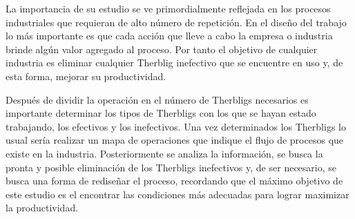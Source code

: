 \documentclass[letterpaper,12pt,openright,oneside]{article}
\theoremstyle{plain}
\begin{document}
La importancia de su estudio se ve primordialmente reflejada en los procesos industriales que requieran de alto número de repetición. En el diseño del trabajo lo más importante es que cada acción que lleve a cabo la empresa o industria brinde algún valor agregado al proceso. Por tanto el objetivo de cualquier industria es eliminar cualquier Therblig inefectivo que se encuentre en uso y, de esta forma, mejorar su productividad.

Después de dividir la operación en el número de Therbligs necesarios es importante determinar los tipos de Therbligs con los que se hayan estado trabajando, los efectivos y los inefectivos. Una vez determinados los Therbligs lo usual sería realizar un mapa de operaciones que indique el flujo de procesos que existe en la industria. Posteriormente se analiza la información, se busca la pronta y posible eliminación de los Therbligs inefectivos y, de ser necesario, se busca una forma de rediseñar el proceso, recordando que el máximo objetivo de este estudio es el encontrar las condiciones más adecuadas para lograr maximizar la productividad.



% 

\end{document}
